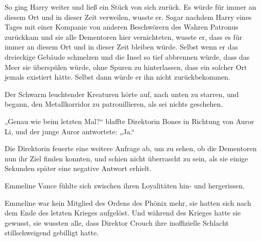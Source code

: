 So ging Harry weiter und ließ ein Stück von sich zurück. Es würde für immer an diesem Ort und in dieser Zeit verweilen, wusste er. Sogar nachdem Harry eines Tages mit einer Kompanie von anderen Beschwörern des Wahren Patronus zurückkam und sie alle Dementoren hier vernichteten, wusste er, dass es für immer an diesem Ort und in dieser Zeit bleiben würde. Selbst wenn er das dreieckige Gebäude schmelzen und die Insel so tief abbrennen würde, dass das Meer sie überspülen würde, ohne Spuren zu hinterlassen, dass ein solcher Ort jemals existiert hätte. Selbst dann würde er ihn nicht zurückbekommen.

\later

Der Schwarm leuchtender Kreaturen hörte auf, nach unten zu starren, und begann, den Metallkorridor zu patrouillieren, als sei nichts geschehen.

„Genau wie beim letzten Mal?“ blaffte Direktorin Bones in Richtung von Auror Li, und der junge Auror antwortete: „Ja.“

Die Direktorin feuerte eine weitere Anfrage ab, um zu sehen, ob die Dementoren nun ihr Ziel finden konnten, und schien nicht überrascht zu sein, als sie einige Sekunden später eine negative Antwort erhielt.

Emmeline Vance fühlte sich zwischen ihren Loyalitäten hin- und hergerissen.

Emmeline war kein Mitglied des Ordens des Phönix mehr, sie hatten sich nach dem Ende des letzten Krieges aufgelöst. Und während des Krieges hatte sie gewusst, sie wussten alle, dass Direktor Crouch ihre inoffizielle Schlacht stillschweigend gebilligt hatte.

